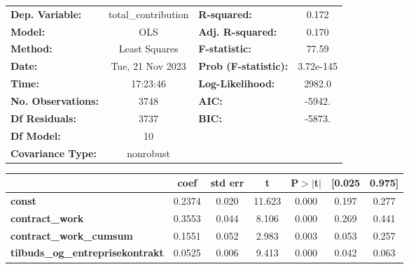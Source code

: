 \begin{center}
\begin{tabular}{lclc}
\toprule
\textbf{Dep. Variable:}                   & total\_contribution & \textbf{  R-squared:         } &     0.172   \\
\textbf{Model:}                           &         OLS         & \textbf{  Adj. R-squared:    } &     0.170   \\
\textbf{Method:}                          &    Least Squares    & \textbf{  F-statistic:       } &     77.59   \\
\textbf{Date:}                            &   Tue, 21 Nov 2023  & \textbf{  Prob (F-statistic):} & 3.72e-145   \\
\textbf{Time:}                            &       17:23:46      & \textbf{  Log-Likelihood:    } &    2982.0   \\
\textbf{No. Observations:}                &          3748       & \textbf{  AIC:               } &    -5942.   \\
\textbf{Df Residuals:}                    &          3737       & \textbf{  BIC:               } &    -5873.   \\
\textbf{Df Model:}                        &            10       & \textbf{                     } &             \\
\textbf{Covariance Type:}                 &      nonrobust      & \textbf{                     } &             \\
\bottomrule
\end{tabular}
\begin{tabular}{lcccccc}
                                          & \textbf{coef} & \textbf{std err} & \textbf{t} & \textbf{P$> |$t$|$} & \textbf{[0.025} & \textbf{0.975]}  \\
\midrule
\textbf{const}                            &       0.2374  &        0.020     &    11.623  &         0.000        &        0.197    &        0.277     \\
\textbf{contract\_work}                   &       0.3553  &        0.044     &     8.106  &         0.000        &        0.269    &        0.441     \\
\textbf{contract\_work\_cumsum}           &       0.1551  &        0.052     &     2.983  &         0.003        &        0.053    &        0.257     \\
\textbf{tilbuds\_og\_entreprisekontrakt}  &       0.0525  &        0.006     &     9.413  &         0.000        &        0.042    &        0.063     \\

\end{tabular}
\end{center}

